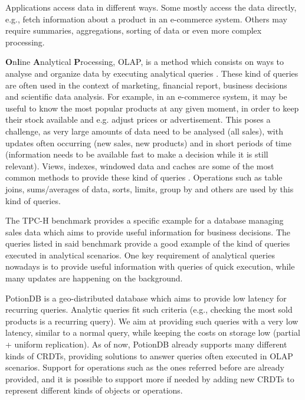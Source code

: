 Applications access data in different ways.
Some mostly access the data directly, e.g., fetch information about a product in an e-commerce system.
Others may require summaries, aggregations, sorting of data or even more complex processing.

\textbf{O}n\textbf{l}ine \textbf{A}nalytical \textbf{P}rocessing, OLAP, is a method which consists on ways to analyse and organize data by executing analytical queries \cite{dbtoaster, viewSelection, optIncMaintenance, effMaintenance}.
These kind of queries are often used in the context of marketing, financial report, business decisions and scientific data analysis.
For example, in an e-commerce system, it may be useful to know the most popular products at any given moment, in order to keep their stock available and e.g. adjust prices or advertisement.
This poses a challenge, as very large amounts of data need to be analysed (all sales), with updates often occurring (new sales, new products) and in short periods of time (information needs to be available fast to make a decision while it is still relevant).
Views, indexes, windowed data and caches are some of the most common methods to provide these kind of queries \cite{noria, dbtoaster, pequod, txcache, viewSelection, optIncMaintenance, effMaintenance}.
Operations such as table joins, sums/averages of data, sorts, limits, group by and others are used by this kind of queries. 

The TPC-H benchmark \cite{tpch, dbtoaster, partView, lazyMaintenance} provides a specific example for a database managing sales data which aims to provide useful information for business decisions.
The queries listed in said benchmark provide a good example of the kind of queries executed in analytical scenarios.
One key requirement of analytical queries nowadays is to provide useful information with queries of quick execution, while many updates are happening on the background.

PotionDB is a geo-distributed database which aims to provide low latency for recurring queries.
Analytic queries fit such criteria (e.g., checking the most sold products is a recurring query).
We aim at providing such queries with a very low latency, similar to a normal query, while keeping the costs on storage low (partial + uniform replication).
As of now, PotionDB already supports many different kinds of CRDTs, providing solutions to answer queries often executed in OLAP scenarios.
Support for operations such as the ones referred before are already provided, and it is possible to support more if needed by adding new CRDTs to represent different kinds of objects or operations.
 

